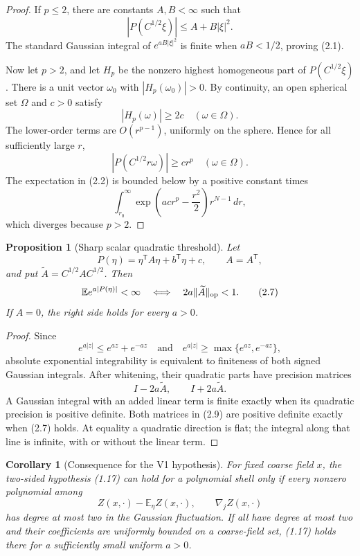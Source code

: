 \documentclass[11pt]{article}
\newtheorem{proposition}[theorem]{Proposition}
\newtheorem{corollary}[theorem]{Corollary}
\theoremstyle{remark}
\begin{document}
\begin{proof}
If \(p\leq2\), there are constants \(A,B<\infty\) such that
\[
 |P(C^{1/2}\xi)|\leq A+B|\xi|^2.                   \tag{2.3}
\]
The standard Gaussian integral of
\(e^{aB|\xi|^2}\) is finite when \(aB<1/2\), proving (2.1).

Now let \(p>2\), and let \(H_p\) be the nonzero highest homogeneous
part of \(P(C^{1/2}\xi)\).  There is a unit vector \(\omega_0\) with
\(|H_p(\omega_0)|>0\).  By continuity, an open spherical set
\(\Omega\) and \(c>0\) satisfy
\[
 |H_p(\omega)|\geq2c
 \quad(\omega\in\Omega).                            \tag{2.4}
\]
The lower-order terms are \(O(r^{p-1})\), uniformly on the sphere.
Hence for all sufficiently large \(r\),
\[
 |P(C^{1/2}r\omega)|\geq cr^p
 \quad(\omega\in\Omega).                            \tag{2.5}
\]
The expectation in (2.2) is bounded below by a positive constant
times
\[
 \int_{r_0}^{\infty}
 \exp\left(acr^p-\frac{r^2}{2}\right)r^{N-1}\,dr,   \tag{2.6}
\]
which diverges because \(p>2\).
\end{proof}

\begin{proposition}[Sharp scalar quadratic threshold]
\label{prop:v17v2-quadratic}
Let
\[
 P(\eta)=\eta^{\mathsf T}A\eta+b^{\mathsf T}\eta+c,
 \qquad A=A^{\mathsf T},
\]
and put \(\widetilde A=C^{1/2}AC^{1/2}\).  Then
\[
 {\mathbb E}e^{a|P(\eta)|}<\infty
 \quad\Longleftrightarrow\quad
 2a\|\widetilde A\|_{\rm op}<1.                    \tag{2.7}
\]
If \(A=0\), the right side holds for every \(a>0\).
\end{proposition}

\begin{proof}
Since
\[
 e^{a|z|}\leq e^{az}+e^{-az}
 \quad\text{and}\quad
 e^{a|z|}\geq\max\{e^{az},e^{-az}\},                \tag{2.8}
\]
absolute exponential integrability is equivalent to finiteness of
both signed Gaussian integrals.  After whitening, their quadratic
parts have precision matrices
\[
 I-2a\widetilde A,\qquad I+2a\widetilde A.          \tag{2.9}
\]
A Gaussian integral with an added linear term is finite exactly when
its quadratic precision is positive definite.  Both matrices in
(2.9) are positive definite exactly when (2.7) holds.  At equality a
quadratic direction is flat; the integral along that line is
infinite, with or without the linear term.
\end{proof}

\begin{corollary}[Consequence for the V1 hypothesis]
\label{cor:v17v2-v1-failure}
For fixed coarse field \(x\), the two-sided hypothesis (1.17) can
hold for a polynomial shell only if every nonzero polynomial among
\[
 Z(x,\cdot)-{\mathbb E}_\eta Z(x,\cdot),
 \qquad \nabla_jZ(x,\cdot)                          \tag{2.10}
\]
has degree at most two in the Gaussian fluctuation.  If all have
degree at most two and their coefficients are uniformly bounded on
a coarse-field set, (1.17) holds there for a sufficiently small
uniform \(a>0\).
\end{corollary}
\end{document}
